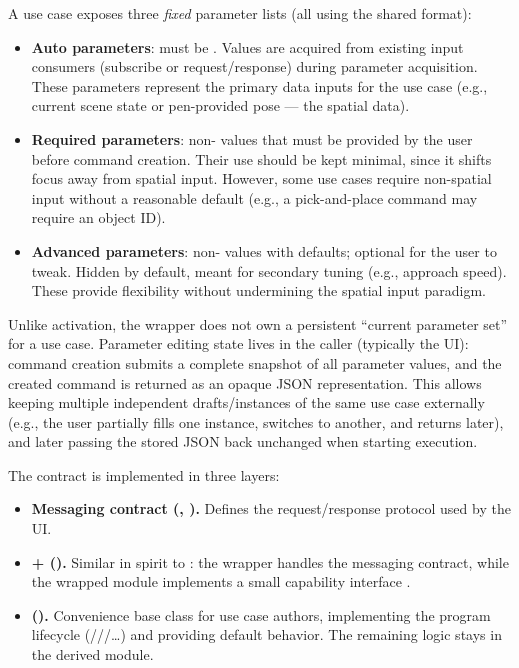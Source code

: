 A use case exposes three \emph{fixed} parameter lists (all using the shared  format):
\begin{itemize}
    \item \textbf{Auto parameters}: must be . Values are acquired from existing input consumers (subscribe or request/response) during parameter acquisition. These parameters represent the primary data inputs for the use case (e.g., current scene state or pen-provided pose --- the spatial data).
    \item \textbf{Required parameters}: non- values that must be provided by the user before command creation. Their use should be kept minimal, since it shifts focus away from spatial input. However, some use cases require non-spatial input without a reasonable default (e.g., a pick-and-place command may require an object ID).
    \item \textbf{Advanced parameters}: non- values with defaults; optional for the user to tweak. Hidden by default, meant for secondary tuning (e.g., approach speed). These provide flexibility without undermining the spatial input paradigm.
\end{itemize}

Unlike activation, the wrapper does not own a persistent ``current parameter set'' for a use case. Parameter editing state lives in the caller (typically the UI): command creation submits a complete snapshot of all parameter values, and the created command is returned as an opaque JSON representation. This allows keeping multiple independent drafts/instances of the same use case externally (e.g., the user partially fills one instance, switches to another, and returns later), and later passing the stored JSON back unchanged when starting execution.

The contract is implemented in three layers:
\begin{itemize}
    \item \textbf{Messaging contract (, ).} Defines the request/response protocol used by the UI.
    \item \textbf{ +  ().} Similar in spirit to : the wrapper handles the messaging contract, while the wrapped module implements a small capability interface .
    \item \textbf{ ().} Convenience base class for use case authors, implementing the program lifecycle (///\dots) and providing default  behavior. The remaining \DIFdelbegin {}\DIFdelend \DIFaddbegin {}\DIFaddend logic stays in the derived module.
\end{itemize}

